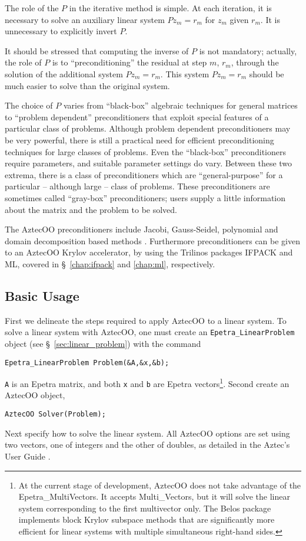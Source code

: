 The role of the $P$ in the iterative method is simple. At each
iteration, it is necessary to solve an auxiliary linear system
$P z_m = r_m$ for $z_m$ given $r_m$.
It is unnecessary to explicitly invert $P$.

It should be stressed that computing the inverse of $P$ is not
mandatory; actually, the role of $P$ is to ``preconditioning'' the
residual at step $m$, $r_m$, through the solution of the additional
system $P z_m = r_m$. This system $P z_m = {r}_m$ should be much easier
to solve than the original system.

\smallskip

The choice of $P$ varies from ``black-box'' algebraic techniques
for general matrices to ``problem dependent''
preconditioners that exploit special features of a particular class
of problems. Although problem dependent preconditioners may be very
powerful, there is still a practical need for efficient
preconditioning techniques for large classes of problems. 
Even the ``black-box'' preconditioners require parameters, and suitable
parameter settings do vary.  Between these two extrema, 
there is a class of preconditioners which are
``general-purpose'' for a particular -- although large -- class of
problems.  These preconditioners are sometimes called ``gray-box''
preconditioners; users supply a little information about
the matrix and the problem to be solved.

The AztecOO preconditioners include Jacobi, Gauss-Seidel, polynomial and
domain decomposition based methods \cite{smbg:96}. 
Furthermore preconditioners can be
given to an AztecOO Krylov accelerator, by using the Trilinos packages
IFPACK and ML, covered in \S~\ref{chap:ifpack} and \ref{chap:ml},
respectively.


\subsection{Basic Usage}
\label{sec:basic_aztecoo}

First we delineate the steps required to apply 
AztecOO to a linear system.
To solve a linear system with AztecOO, one must create an
\verb!Epetra_LinearProblem!  object (see
\S~\ref{sec:linear_problem}) with the command
\begin{verbatim}
Epetra_LinearProblem Problem(&A,&x,&b);
\end{verbatim}
\verb!A! is an Epetra matrix, and both \verb!x! and \verb!b! are Epetra
vectors\footnote{At the current stage of development, AztecOO does not
  take advantage of the Epetra\_MultiVectors. It accepts Multi\_Vectors,
  but it will solve the linear system corresponding to the first
  multivector only.
  The Belos package implements block Krylov subspace methods that are
  significantly more efficient for linear systems with multiple simultaneous right-hand sides.
}.  Second create an AztecOO object,
\begin{verbatim}
AztecOO Solver(Problem);
\end{verbatim}
Next specify how to solve the linear system. All AztecOO options are set
using two vectors, one of integers and the other of doubles, as detailed
in the Aztec's User Guide \cite{Aztec2.1}.

